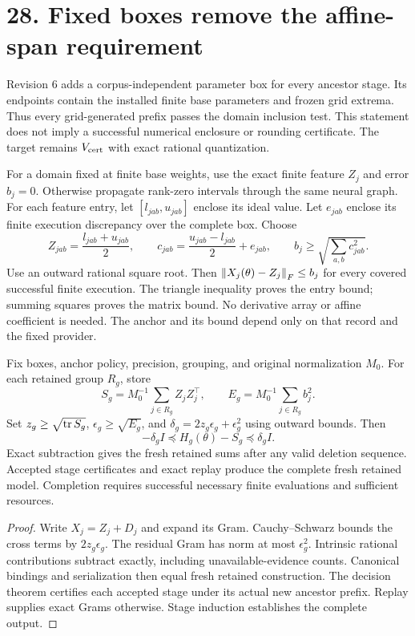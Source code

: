 \newpage
\section*{28. Fixed boxes remove the affine-span requirement}
Revision 6 adds a corpus-independent parameter box for every ancestor stage.
Its endpoints contain the installed finite base parameters and frozen grid extrema.
Thus every grid-generated prefix passes the domain inclusion test.
This statement does not imply a successful numerical enclosure or rounding certificate.
The target remains $V_{\rm cert}$ with exact rational quantization.

For a domain fixed at finite base weights, use the exact finite feature $Z_j$ and error $b_j=0$.
Otherwise propagate rank-zero intervals through the same neural graph.
For each feature entry, let $[l_{jab},u_{jab}]$ enclose its ideal value.
Let $e_{jab}$ enclose its finite execution discrepancy over the complete box.
Choose
\[
 Z_{jab}=\frac{l_{jab}+u_{jab}}2,\qquad
 c_{jab}=\frac{u_{jab}-l_{jab}}2+e_{jab},\qquad
 b_j\ge\sqrt{\sum_{a,b}c_{jab}^2}.
\]
Use an outward rational square root.
Then $\left\|X_j(\theta)-Z_j\right\|_F\le b_j$ for every covered successful finite execution.
The triangle inequality proves the entry bound; summing squares proves the matrix bound.
No derivative array or affine coefficient is needed.
The anchor and its bound depend only on that record and the fixed provider.

\begin{theorem}
Fix boxes, anchor policy, precision, grouping, and original normalization $M_0$.
For each retained group $R_g$, store
\[
 S_g=M_0^{-1}\sum_{j\in R_g}Z_jZ_j^\top,
 \qquad E_g=M_0^{-1}\sum_{j\in R_g}b_j^2.
\]
Set $z_g\ge\sqrt{\operatorname{tr} S_g}$, $\epsilon_g\ge\sqrt{E_g}$, and
$\delta_g=2z_g\epsilon_g+\epsilon_g^2$ using outward bounds.
Then
\[
 -\delta_g I\preceq H_g(\theta)-S_g\preceq\delta_g I.
\]
Exact subtraction gives the fresh retained sums after any valid deletion sequence.
Accepted stage certificates and exact replay produce the complete fresh retained model.
Completion requires successful necessary finite evaluations and sufficient resources.
\end{theorem}
\begin{proof}
Write $X_j=Z_j+D_j$ and expand its Gram.
Cauchy--Schwarz bounds the cross terms by $2z_g\epsilon_g$.
The residual Gram has norm at most $\epsilon_g^2$.
Intrinsic rational contributions subtract exactly, including unavailable-evidence counts.
Canonical bindings and serialization then equal fresh retained construction.
The decision theorem certifies each accepted stage under its actual new ancestor prefix.
Replay supplies exact Grams otherwise.
Stage induction establishes the complete output.
\end{proof}

